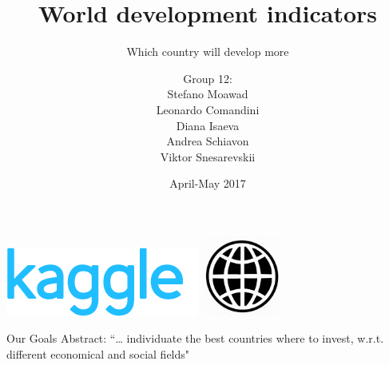 \documentclass[9pt]{beamer}
\title[World development indicators]{\huge World development indicators}
\subtitle[Which country will develop more]{\large Which country will develop more}
\author[Moawad, Comandini, Isaeva, Schiavon, Snesarevskii] {{\Large Group 12:\\}Stefano Moawad\\Leonardo Comandini\\Diana Isaeva\\Andrea Schiavon\\Viktor Snesarevskii}
\date{April-May 2017}
\begin{document}
	\begin{frame}
	\titlepage
	\vfill
	\begin{flushright}
		\includegraphics[height=.7cm]{kaggle.png}\quad
		\includegraphics[height=.7cm]{worldbank.jpg}
	\end{flushright}
\end{frame}

\begin{frame}{Our Goals} 
Abstract: “… individuate the best countries where to invest, w.r.t. different economical and social fields"
\begin{itemize}  %
\end{itemize}
\end{frame}
\end{document}

